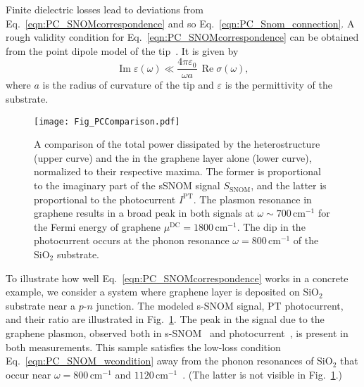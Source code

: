 \documentclass[aps, prb, reprint, superscriptaddress]{revtex4-2}
\DeclareMathOperator{\re}{Re}
\DeclareMathOperator{\im}{Im}
\begin{document}
Finite dielectric losses lead to deviations
from Eq.~\eqref{eqn:PC_SNOMcorrespondence} and so Eq.~\eqref{eqn:PC_Snom_connection}.
A rough validity condition for Eq.~\eqref{eqn:PC_SNOMcorrespondence} can be obtained from the point dipole model of the tip~\cite{Cvitkovic2007}. It is given by
\begin{equation}
\im \varepsilon(\omega) \ll
\frac{4\pi \varepsilon_0}{\omega a}\, \re \sigma(\omega) , 
\label{eqn:PC_SNOM_wcondition}
\end{equation}
where $a$ is the radius of curvature of the tip and $\varepsilon$ is the permittivity of the substrate. 

\begin{figure}[t]
\texttt{[image: Fig\_PCComparison.pdf]}
\caption{A comparison of the total power dissipated by the heterostructure (upper curve) and the in the graphene layer alone (lower curve), normalized to their respective maxima.
The former is proportional to the imaginary part of the s{\-}SNOM signal $S_\mathrm{SNOM}$, and the latter is proportional to the photocurrent $I^\text{PT}$. 
The plasmon resonance in graphene results in a broad peak in both signals at $\omega \sim 700 \, \mathrm{cm}^{-1}$
for the Fermi energy of graphene $\mu^\text{DC} = 1800\, \mathrm{cm}^{-1}$. 
The dip in the photocurrent occurs at the phonon resonance 
$\omega = 800 \, \mathrm{cm}^{-1}$ of the SiO$_2$ substrate.
}
\label{fig:SNOM_G}
\end{figure}

To illustrate how well Eq.~\eqref{eqn:PC_SNOMcorrespondence} works in a concrete example, we consider a system where graphene layer is deposited on SiO$_2$ substrate near a $p$-$n$ junction.
The modeled s-SNOM signal, PT photocurrent, and their ratio are illustrated in Fig.~\ref{fig:SNOM_G}.  
The peak in the signal due to the graphene plasmon, observed both in s-SNOM~\cite{Fei2011} and photocurrent~\cite{Freitag2013}, is present in both measurements.
This sample satisfies the low-loss condition Eq.~\eqref{eqn:PC_SNOM_wcondition} away from the phonon resonances of SiO$_2$ that occur near $\omega = 800\, \mathrm{cm}^{-1}$ and $1120\, \mathrm{cm}^{-1}$~\cite{Kucirkova1994}.
(The latter is not visible in Fig.~\ref{fig:SNOM_G}.)
\end{document}

